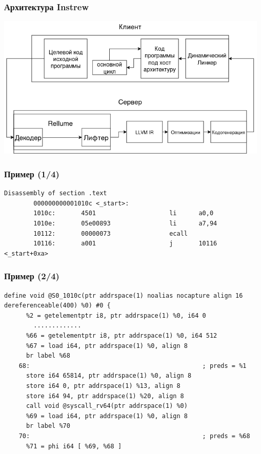 \documentclass{vkr-slides-style}
\begin{document}
\begin{frame}
    \frametitle{Архитектура Instrew}
    \includegraphics[width=370pt]{pictures/instrew.drawio.png}
\end{frame}

\begin{frame}[fragile]
    \frametitle{Пример (1/4)}
    \begin{lstlisting}[caption={objdump -d exit.S}, frame=single, breaklines, basicstyle=\footnotesize]
        Disassembly of section .text
        000000000001010c <_start>:
        1010c:       4501                    li      a0,0
        1010e:       05e00893                li      a7,94
        10112:       00000073                ecall
        10116:       a001                    j       10116 <_start+0xa>

    \end{lstlisting}

\end{frame}
\begin{frame}[fragile]
    \frametitle{Пример (2/4)}
    \vspace{-4pt}
    \begin{lstlisting}[caption={./build/server/instrew --dumpir=lift ./test/riscv64/exit}, frame=single, breaklines, basicstyle=\footnotesize]
    define void @S0_1010c(ptr addrspace(1) noalias nocapture align 16 dereferenceable(400) %0) #0 {
      %2 = getelementptr i8, ptr addrspace(1) %0, i64 0
        .............
      %66 = getelementptr i8, ptr addrspace(1) %0, i64 512
      %67 = load i64, ptr addrspace(1) %0, align 8
      br label %68
    68:                                               ; preds = %1
      store i64 65814, ptr addrspace(1) %0, align 8
      store i64 0, ptr addrspace(1) %13, align 8
      store i64 94, ptr addrspace(1) %20, align 8
      call void @syscall_rv64(ptr addrspace(1) %0)
      %69 = load i64, ptr addrspace(1) %0, align 8
      br label %70
    70:                                               ; preds = %68
      %71 = phi i64 [ %69, %68 ]
    \end{lstlisting}
\end{frame}
\end{document}
